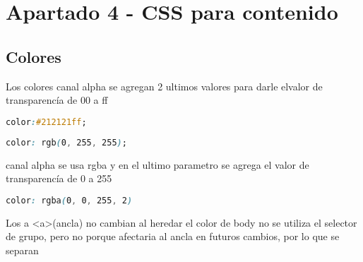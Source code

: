 \section{Apartado 4 - CSS para contenido}

\subsection{Colores}

Los colores canal alpha se agregan 2 ultimos valores para darle elvalor de transparencía de  00 a ff
\begin{lstlisting}[caption={Colores en css con hexadecimal},label={css: colores-hexadecimal},language=css]
    color:#212121ff;
\end{lstlisting}

\begin{lstlisting}[caption={Colores en css con hexadecimal},label={css: colores-rgb},language=css]
    color: rgb(0, 255, 255);
\end{lstlisting}


canal alpha se usa rgba y en el ultimo parametro se agrega 
el valor de transparencía de 0 a 255
\begin{lstlisting}[caption={Colores en css con hexadecimal},label={css: colores-rgba},language=css]
    color: rgba(0, 0, 255, 2)
\end{lstlisting}


Los a <a>(ancla) no cambian al heredar el color de body 
no se utiliza el selector de grupo, pero no porque afectaria 
al ancla en futuros cambios, por lo que se separan
